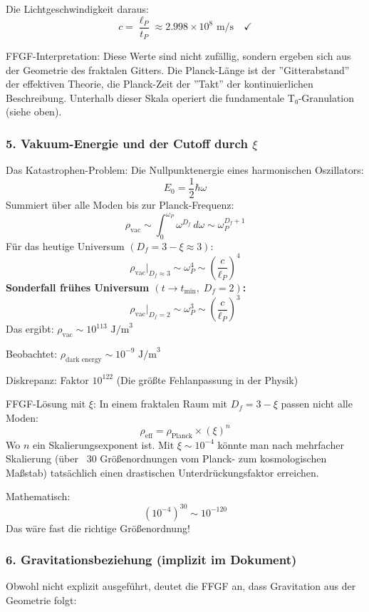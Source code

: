 	Die Lichtgeschwindigkeit daraus:
	\[
	c = \frac{\ell_P}{t_P} \approx 2.998 \times 10^8 \text{ m/s} \quad \checkmark
	\]
	
	FFGF-Interpretation:
	Diese Werte sind nicht zufällig, sondern ergeben sich aus der Geometrie des fraktalen Gitters. Die Planck-Länge ist der ''Gitterabstand'' der effektiven Theorie, die Planck-Zeit der ''Takt'' der kontinuierlichen Beschreibung. Unterhalb dieser Skala operiert die fundamentale T₀-Granulation (siehe oben).
	
	\subsubsection{5. Vakuum-Energie und der Cutoff durch \( \xi \)}
	Das Katastrophen-Problem:
	Die Nullpunktenergie eines harmonischen Oszillators:
	\[
	E_0 = \frac{1}{2}\hbar\omega
	\]
	Summiert über alle Moden bis zur Planck-Frequenz:
	\[
	\rho_{\text{vac}} \sim \int_0^{\omega_P} \omega^{D_f} \, d\omega \sim \omega_P^{D_f+1}
	\]
	Für das heutige Universum \((D_f = 3-\xi \approx 3)\):
	\[
	\rho_{\text{vac}}\big|_{D_f \approx 3} \sim \omega_P^4 \sim \left(\frac{c}{\ell_P}\right)^4
	\]
	\textbf{Sonderfall frühes Universum \((t \to t_{\min},\; D_f = 2)\):}
	\[
	\rho_{\text{vac}}\big|_{D_f=2} \sim \omega_P^3 \sim \left(\frac{c}{\ell_P}\right)^3
	\]
	Das ergibt: \( \rho_{\text{vac}} \sim 10^{113} \text{ J/m}^3 \)
	
	Beobachtet: \( \rho_{\text{dark energy}} \sim 10^{-9} \text{ J/m}^3 \)
	
	Diskrepanz: Faktor \( 10^{122} \) (Die größte Fehlanpassung in der Physik)
	
	FFGF-Lösung mit \( \xi \):
	In einem fraktalen Raum mit \( D_f = 3 - \xi \) passen nicht alle Moden:
	\[
	\rho_{\text{eff}} = \rho_{\text{Planck}} \times (\xi)^n
	\]
	Wo \( n \) ein Skalierungsexponent ist. Mit \( \xi \sim 10^{-4} \) könnte man nach mehrfacher Skalierung (über ~30 Größenordnungen vom Planck- zum kosmologischen Maßstab) tatsächlich einen drastischen Unterdrückungsfaktor erreichen.
	
	Mathematisch:
	\[
	(10^{-4})^{30} \sim 10^{-120}
	\]
	Das wäre fast die richtige Größenordnung!
	
	\subsubsection{6. Gravitationsbeziehung (implizit im Dokument)}
	Obwohl nicht explizit ausgeführt, deutet die FFGF an, dass Gravitation aus der Geometrie folgt:
	
